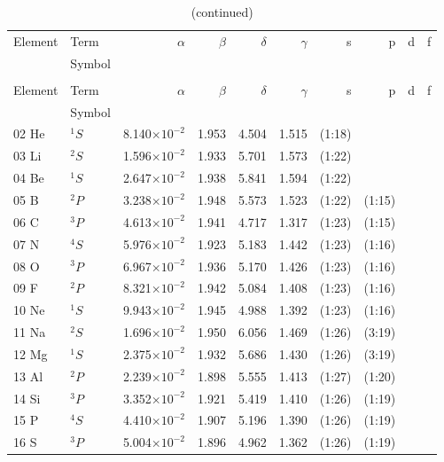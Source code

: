 \documentclass[12pt]{report}
\newcommand{\notetodylan}[1]{\textcolor{red}{#1}} %
\begin{document}
\begin{longtable}{l l r r r r r r r r}
\caption[Basis sets optimized using rWTBS]{Basis sets optimized using rWTBS \notetodylan{make these a multirow}}\label{tab:BStab} \\
\toprule
	Element	&	Term		&	$\alpha$	&	$\beta$	&	$\delta$	&	$\gamma$	&	s	&	p	&	d	&	f	\\
			&	Symbol	&			&			&			&				&		&		&		&		\\
\midrule
\endfirsthead
\caption[]{(continued)}\\
\toprule
	Element	&	Term		&	$\alpha$	&	$\beta$	&	$\delta$	&	$\gamma$	&	s	&	p	&	d	&	f	\\
			&	Symbol	&			&			&			&				&		&		&		&		\\
\midrule
\endhead
02 He & $^{1}S$ & 8.140$\times10^{-2}$ & 1.953 & 4.504 & 1.515 & (1:18) \\
03 Li & $^{2}S$ & 1.596$\times10^{-2}$ & 1.933 & 5.701 & 1.573 & (1:22)  \\
04 Be & $^{1}S$ & 2.647$\times10^{-2}$ & 1.938 & 5.841 & 1.594 & (1:22) \\	
05 B & $^{2}P$ & 3.238$\times10^{-2}$ & 1.948 & 5.573 & 1.523 & (1:22) & (1:15) \\
06 C & $^{3}P$ & 4.613$\times10^{-2}$ & 1.941 & 4.717 & 1.317 & (1:23) & (1:15) \\
07 N & $^{4}S$ & 5.976$\times10^{-2}$ & 1.923 & 5.183 & 1.442 & (1:23) & (1:16)  \\
08 O & $^{3}P$ & 6.967$\times10^{-2}$ & 1.936 & 5.170 & 1.426 & (1:23) & (1:16) \\
09 F & $^{2}P$ & 8.321$\times10^{-2}$ & 1.942 & 5.084 & 1.408 & (1:23) & (1:16) \\
10 Ne & $^{1}S$ & 9.943$\times10^{-2}$ & 1.945 & 4.988 & 1.392 & (1:23) & (1:16) \\
11 Na & $^{2}S$ & 1.696$\times10^{-2}$ & 1.950 & 6.056 & 1.469 & (1:26) & (3:19)  \\
12 Mg & $^{1}S$ & 2.375$\times10^{-2}$ & 1.932 & 5.686 & 1.430 & (1:26) & (3:19) \\
13 Al & $^{2}P$ & 2.239$\times10^{-2}$ & 1.898 & 5.555 & 1.413 & (1:27) & (1:20)  \\
14 Si & $^{3}P$ & 3.352$\times10^{-2}$ & 1.921 & 5.419 & 1.410 & (1:26) & (1:19)  \\
15 P & $^{4}S$ & 4.410$\times10^{-2}$ & 1.907 & 5.196 & 1.390 & (1:26) & (1:19)     \\
16 S & $^{3}P$ & 5.004$\times10^{-2}$ & 1.896 & 4.962 & 1.362 & (1:26) & (1:19)     \\

\end{longtable}
\end{document}
